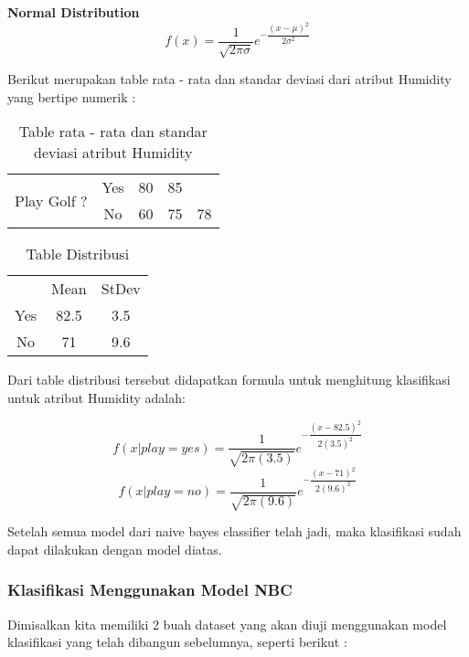 		\textbf{Normal Distribution}
		\begin{equation}
			f(x) = \dfrac{1}{\sqrt{2\pi\sigma}}e^{-\dfrac{(x-\mu)^2}{2\sigma^2}}
		\end{equation}
		
		Berikut merupakan table rata - rata dan standar deviasi dari atribut Humidity yang bertipe numerik : 
		
		\begin{table}[h]
		\centering
		\caption{Table rata - rata dan standar deviasi atribut Humidity}
		\begin{tabular}{|c|c|c|c|c|}
		\toprule
		\multirow{2}{*}{Play Golf ?} & Yes & 80 & 85 & \\
		 & No & 60 & 75 & 78 \\
		\bottomrule
		\end{tabular}
		\end{table}
		
		\begin{table}[ht]
		\centering
		\caption{Table Distribusi}
		\begin{tabular}{|c|c|c|}
		\toprule
		 & Mean & StDev \\
		Yes & 82.5 & 3.5 \\
		No & 71 & 9.6 \\
		\bottomrule
		\end{tabular}
		\end{table}
		
		Dari table distribusi tersebut didapatkan formula untuk menghitung klasifikasi untuk atribut Humidity adalah:
		
		\begin{equation}
			f(x|play=yes) = \dfrac{1}{\sqrt{2\pi(3.5)}}e^{-\dfrac{(x-82.5)^2}{2(3.5)^2}}
		\end{equation}
		\begin{equation}
			f(x|play=no) = \dfrac{1}{\sqrt{2\pi(9.6)}}e^{-\dfrac{(x-71)^2}{2(9.6)^2}} 
		\end{equation}
		
		Setelah semua model dari naive bayes classifier telah jadi, maka klasifikasi sudah dapat dilakukan dengan model diatas.

\subsubsection{Klasifikasi Menggunakan Model NBC}
		Dimisalkan kita memiliki 2 buah dataset yang akan diuji menggunakan model klasifikasi yang telah dibangun sebelumnya, seperti berikut :
		
